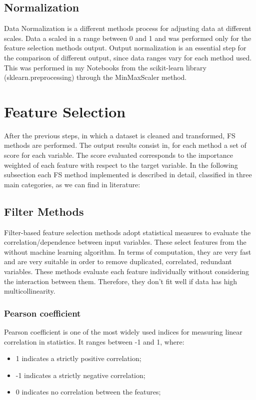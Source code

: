 \subsection{Normalization}
Data Normalization is a different methods process for adjusting data at different scales. Data a scaled in a range between 0 and 1 and was performed only for the feature selection methods output.
Output normalization is an essential step for the comparison of different output, since data ranges vary for each method used.\newline
This was performed in my Notebooks from the scikit-learn library (sklearn.preprocessing) through the MinMaxScaler method.

\section{Feature Selection}
After the previous steps, in which a dataset is cleaned and transformed, FS methods are performed. The output results consist in, for each method a set of score for each variable. The score evaluated corresponds to the importance weighted of each feature with respect to the target variable.
In the following subsection each FS method implemented is described in detail, classified in three main categories\cite{stanczyk2015feature}, as we can find in literature:
\subsection{Filter Methods}
Filter-based feature selection methods adopt statistical measures to evaluate the correlation/dependence between input variables.\newline
These select features from the without machine learning algorithm. In terms of computation, they are very fast and are very suitable in order to remove duplicated, correlated, redundant variables\cite{saeys2007review}. \newline
These methods evaluate each feature individually without considering the interaction between them. Therefore, they don't fit well if data has high multicollinearity\cite{daoud2017multicollinearity}.

\subsubsection{Pearson coefficient}
Pearson coefficient is one of the most widely used indices for measuring linear correlation in statistics. It ranges between -1 and 1, where:
\begin{itemize}
\item 1 indicates a strictly positive correlation;
\item -1 indicates a strictly negative correlation;
\item0 indicates no correlation between the features;
\end{itemize}

